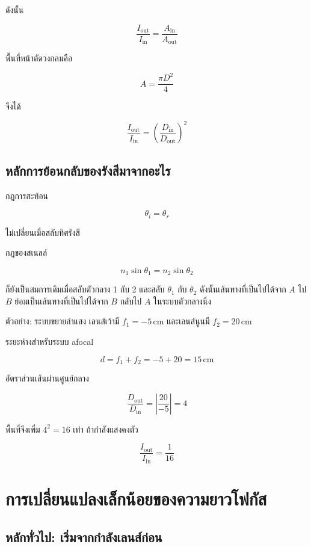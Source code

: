 ดังนั้น

\[
\frac{I_{\text{out}}}{I_{\text{in}}}
=
\frac{A_{\text{in}}}{A_{\text{out}}}
\]

พื้นที่หน้าตัดวงกลมคือ

\[
A=\frac{\pi D^2}{4}
\]

จึงได้

\begin{tcolorbox}[title={ความเข้มของลำแสงในระบบอุดมคติ}]
\[
\boxed{
\frac{I_{\text{out}}}{I_{\text{in}}}
=
\left(
\frac{D_{\text{in}}}{D_{\text{out}}}
\right)^2}
\]
\end{tcolorbox}

\subsection{หลักการย้อนกลับของรังสีมาจากอะไร}

กฎการสะท้อน

\[
\theta_i=\theta_r
\]

ไม่เปลี่ยนเมื่อสลับทิศรังสี

กฎของสเนลล์

\[
n_1\sin\theta_1=n_2\sin\theta_2
\]

ก็ยังเป็นสมการเดิมเมื่อสลับตัวกลาง 1 กับ 2 และสลับ $\theta_1$ กับ $\theta_2$ ดังนั้นเส้นทางที่เป็นไปได้จาก $A$ ไป $B$ ย่อมเป็นเส้นทางที่เป็นไปได้จาก $B$ กลับไป $A$ ในระบบตัวกลางนิ่ง

\begin{examplebox}{ตัวอย่าง: ระบบขยายลำแสง}
เลนส์เว้ามี $f_1=-5\,\mathrm{cm}$ และเลนส์นูนมี $f_2=20\,\mathrm{cm}$

ระยะห่างสำหรับระบบ afocal

\[
d=f_1+f_2
=-5+20
=15\,\mathrm{cm}
\]

อัตราส่วนเส้นผ่านศูนย์กลาง

\[
\frac{D_{\text{out}}}{D_{\text{in}}}
=
\left|\frac{20}{-5}\right|
=4
\]

พื้นที่จึงเพิ่ม $4^2=16$ เท่า ถ้ากำลังแสงคงตัว

\[
\frac{I_{\text{out}}}{I_{\text{in}}}
=
\frac{1}{16}
\]
\end{examplebox}

\section{การเปลี่ยนแปลงเล็กน้อยของความยาวโฟกัส}

\subsection{หลักทั่วไป: เริ่มจากกำลังเลนส์ก่อน}

